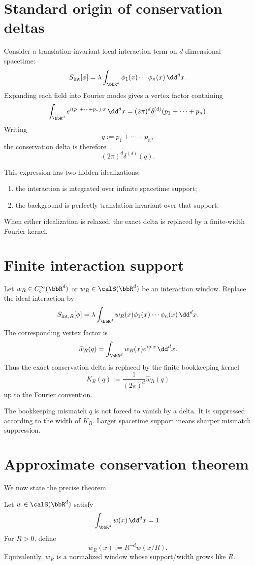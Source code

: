 \documentclass[11pt]{article}
\begin{document}
\section{Standard origin of conservation deltas}

Consider a translation-invariant local interaction term on \(d\)-dimensional spacetime:
\[
S_{\mathrm{int}}[\phi]
=
\lambda\int_{\bbR^d}\phi_1(x)\cdots\phi_n(x)\,\dd^d x .
\]
Expanding each field into Fourier modes gives a vertex factor containing
\[
\int_{\bbR^d}e^{i(p_1+\cdots+p_n)\cdot x}\,\dd^d x
=
(2\pi)^d\delta^{(d)}(p_1+\cdots+p_n).
\]
Writing
\[
q:=p_1+\cdots+p_n,
\]
the conservation delta is therefore
\[
(2\pi)^d\delta^{(d)}(q).
\]

This expression has two hidden idealizations:
\begin{enumerate}
\item the interaction is integrated over infinite spacetime support;
\item the background is perfectly translation invariant over that support.
\end{enumerate}

When either idealization is relaxed, the exact delta is replaced by a finite-width Fourier kernel.

\section{Finite interaction support}

Let \(w_R\in C_c^\infty(\bbR^d)\) or \(w_R\in \calS(\bbR^d)\) be an interaction window.  Replace the ideal interaction by
\[
S_{\mathrm{int},R}[\phi]
=
\lambda\int_{\bbR^d}w_R(x)\phi_1(x)\cdots\phi_n(x)\,\dd^d x .
\]
The corresponding vertex factor is
\[
\widehat w_R(q)
=
\int_{\bbR^d}w_R(x)e^{iq\cdot x}\,\dd^d x .
\]
Thus the exact conservation delta is replaced by the finite bookkeeping kernel
\[
K_R(q):=\frac{1}{(2\pi)^d}\widehat w_R(q)
\]
up to the Fourier convention.

The bookkeeping mismatch \(q\) is not forced to vanish by a delta.  It is suppressed according to the width of \(K_R\).  Larger spacetime support means sharper mismatch suppression.

\section{Approximate conservation theorem}

We now state the precise theorem.

\begin{assumption}
Let \(w\in\calS(\bbR^d)\) satisfy
\[
\int_{\bbR^d}w(x)\,\dd^d x=1.
\]
For \(R>0\), define
\[
w_R(x):=R^{-d}w(x/R).
\]
Equivalently, \(w_R\) is a normalized window whose support/width grows like \(R\).
\end{assumption}
\end{document}
